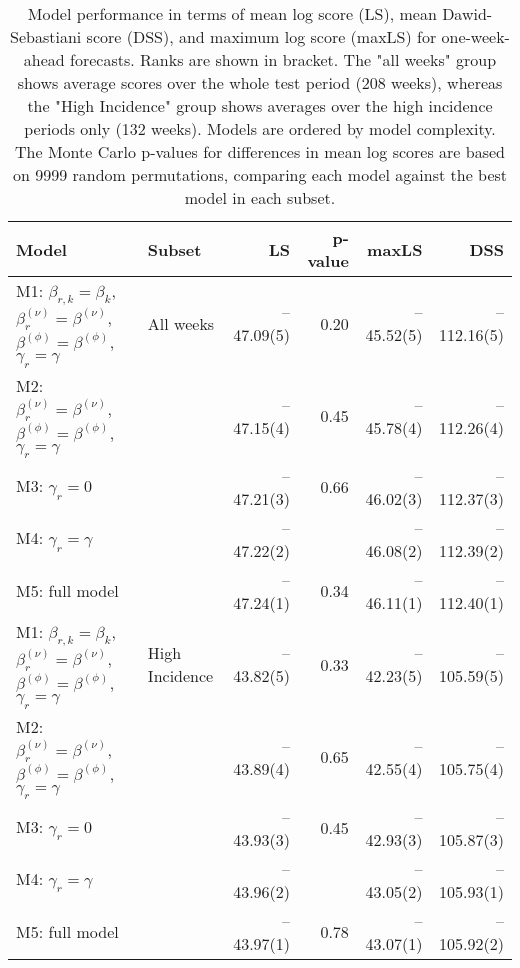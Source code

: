 \begin{table}[ht]
\centering
\begingroup\fontsize{9pt}{10pt}\selectfont
\begin{tabular}{ll|rrrr}
  \hline
Model & Subset & LS & p-value & maxLS & DSS \\ 
  \hline
M1: $\beta_{r,k} = \beta_{k}$, $\beta_{r}^{(\nu)} = \beta^{(\nu)}$, $\beta^{(\phi)} = \beta^{(\phi)}$, $\gamma_r = \gamma$ & All weeks & --47.09(5) & 0.20 & --45.52(5) & --112.16(5) \\ 
  M2: $\beta_{r}^{(\nu)} = \beta^{(\nu)}$, $\beta^{(\phi)} = \beta^{(\phi)}$, $\gamma_r = \gamma$ &  & --47.15(4) & 0.45 & --45.78(4) & --112.26(4) \\ 
  M3: $\gamma_r = 0$ &  & --47.21(3) & 0.66 & --46.02(3) & --112.37(3) \\ 
  M4: $\gamma_r = \gamma$ &  & --47.22(2) &  & --46.08(2) & --112.39(2) \\ 
  M5: full model &  & --47.24(1) & 0.34 & --46.11(1) & --112.40(1) \\ 
   \hline
M1: $\beta_{r,k} = \beta_{k}$, $\beta_{r}^{(\nu)} = \beta^{(\nu)}$, $\beta^{(\phi)} = \beta^{(\phi)}$, $\gamma_r = \gamma$ & High Incidence & --43.82(5) & 0.33 & --42.23(5) & --105.59(5) \\ 
  M2: $\beta_{r}^{(\nu)} = \beta^{(\nu)}$, $\beta^{(\phi)} = \beta^{(\phi)}$, $\gamma_r = \gamma$ &  & --43.89(4) & 0.65 & --42.55(4) & --105.75(4) \\ 
  M3: $\gamma_r = 0$ &  & --43.93(3) & 0.45 & --42.93(3) & --105.87(3) \\ 
  M4: $\gamma_r = \gamma$ &  & --43.96(2) &  & --43.05(2) & --105.93(1) \\ 
  M5: full model &  & --43.97(1) & 0.78 & --43.07(1) & --105.92(2) \\ 
   \hline
\end{tabular}
\endgroup
\caption{Model performance in terms of mean log score (LS),
             mean Dawid-Sebastiani score (DSS), and maximum log score (maxLS)
             for one-week-ahead forecasts.
             Ranks are shown in bracket.
             The "all weeks" group shows average scores over the
             whole test period (208 weeks),
             whereas the "High Incidence" group shows
             averages over the high incidence periods only (132 weeks).
             Models are ordered by model complexity.
             The Monte Carlo p-values for differences in mean log scores
             are based on 9999 random permutations,
             comparing each model against the best model in each subset.} 
\label{tab:forecast}
\end{table}
